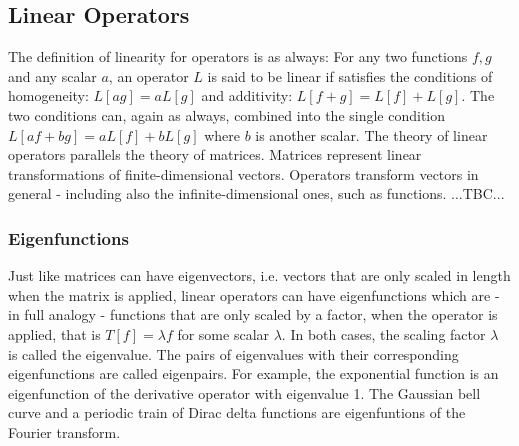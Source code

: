 
\subsection{Linear Operators}
The definition of linearity for operators is as always: For any two functions $f,g$ and any scalar $a$, an operator $L$ is said to be linear if satisfies the conditions of homogeneity: $L[a g] = a L[g]$ and additivity: $L[f+g] = L[f] + L[g]$. The two conditions can, again as always, combined into the single condition $L[af+bg] = aL[f] + bL[g]$ where $b$ is another scalar. The theory of linear operators parallels the theory of matrices. Matrices represent linear transformations of finite-dimensional vectors. Operators transform vectors in general - including also the infinite-dimensional ones, such as functions. ...TBC...


% 


\subsubsection{Eigenfunctions}
Just like matrices can have eigenvectors, i.e. vectors that are only scaled in length when the matrix is applied, linear operators can have eigenfunctions which are - in full analogy - functions that are only scaled by a factor, when the operator is applied, that is $T[f] = \lambda f$ for some scalar $\lambda$. In both cases, the scaling factor $\lambda$ is called the eigenvalue. The pairs of eigenvalues with their corresponding eigenfunctions are called eigenpairs. For example, the exponential function is an eigenfunction of the derivative operator with eigenvalue 1. The Gaussian bell curve and a periodic train of Dirac delta functions are eigenfuntions of the Fourier transform.


